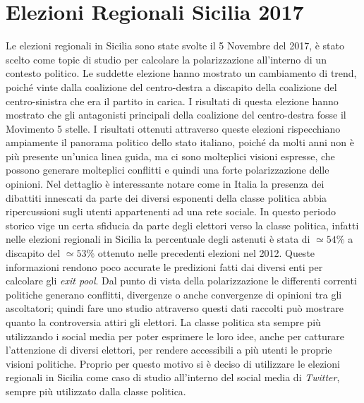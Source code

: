 \section{Elezioni Regionali Sicilia 2017}
\label{EleSicilia}
Le elezioni regionali in Sicilia sono state svolte il 5 Novembre del 2017, è stato scelto come topic di studio per calcolare la polarizzazione all'interno di un contesto politico. Le suddette elezione hanno mostrato un cambiamento di trend, poiché vinte dalla coalizione del centro-destra a discapito della coalizione del centro-sinistra che era il partito in carica. I risultati di questa elezione hanno mostrato che gli antagonisti principali della coalizione del centro-destra fosse il Movimento 5 stelle.
I risultati ottenuti attraverso queste elezioni rispecchiano ampiamente il panorama politico dello stato italiano, poiché da molti anni non è più presente un'unica linea guida, ma ci sono molteplici visioni espresse, che possono generare molteplici conflitti e quindi una forte polarizzazione delle opinioni. Nel dettaglio è interessante notare come in Italia la presenza dei dibattiti innescati da parte dei diversi esponenti della classe politica abbia ripercussioni sugli utenti appartenenti ad una rete sociale.
In questo periodo storico vige un certa sfiducia da parte degli elettori verso la classe politica, infatti nelle elezioni regionali in Sicilia la percentuale degli astenuti è stata di $\simeq 54\%$ a discapito del $\simeq 53\%$ ottenuto nelle precedenti elezioni nel 2012. Queste informazioni rendono poco accurate le predizioni fatti dai diversi enti per calcolare gli \textit{exit pool}.\cite{ElezioniSondaggi}
Dal punto di vista della polarizzazione le differenti correnti politiche generano conflitti, divergenze o anche convergenze di opinioni tra gli ascoltatori; quindi fare uno studio attraverso questi dati raccolti può mostrare quanto la controversia attiri gli elettori.
La classe politica sta sempre più utilizzando i social media per poter esprimere le loro idee, anche per catturare l'attenzione di diversi elettori, per rendere accessibili a più utenti le proprie visioni politiche. 
Proprio per questo motivo si è deciso di utilizzare le elezioni regionali in Sicilia come caso di studio all'interno del social media di \textit{Twitter}, sempre più utilizzato dalla classe politica.

